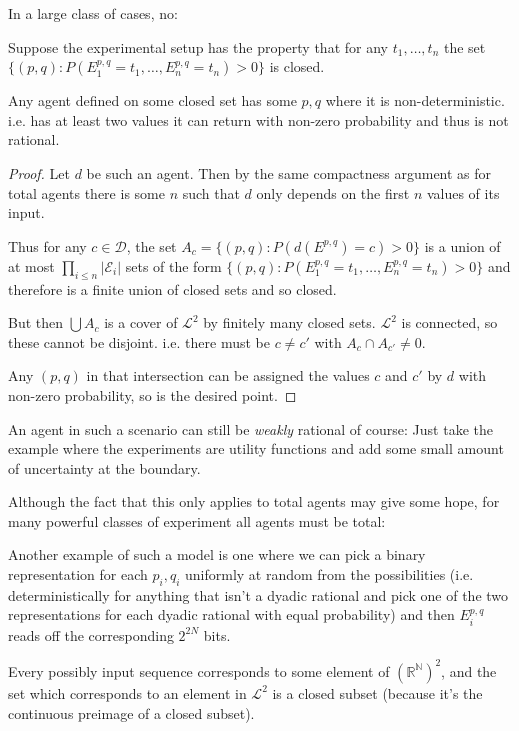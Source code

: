 In a large class of cases, no:

\begin{theorem}
Suppose the experimental setup has the property that for any $t_1, \ldots, t_n$
the set $\{(p, q): P(E^{p, q}_1 = t_1, \ldots, E^{p, q}_n = t_n) > 0\}$
is closed.

Any agent defined on some closed set has some $p, q$ where it is non-deterministic.
i.e. has at least two values it can return with non-zero probability and thus is
not rational.
\end{theorem}

\begin{proof}
Let $d$ be such an agent. Then by the same compactness argument as for total
agents there is some $n$ such that $d$ only depends on the first $n$ values of its input.

Thus for any $c \in \mathcal{D}$,
the set $A_c = \{(p, q): P(d(E^{p, q}) = c) > 0\}$
is a union of at most $\prod\limits_{i \leq n} |\mathcal{E}_i|$
sets of the form $\{(p, q): P(E^{p, q}_1 = t_1, \ldots, E^{p, q}_n = t_n) > 0\}$
and therefore is a finite union of closed sets and so closed.

But then $\bigcup A_c$
is a cover of $\mathcal{L}^2$
by finitely many closed sets. $\mathcal{L}^2$
is connected, so these cannot be disjoint. i.e. there must be $c \neq c'$ 
with $A_c \cap A_{c'} \neq 0$.

Any $(p, q)$
in that intersection can be assigned the values $c$ and $c'$
by $d$
with non-zero probability, so is the desired point.
\end{proof}

An agent in such a scenario can still be \textit{weakly} rational of course:
Just take the example where the experiments are utility functions and add some
small amount of uncertainty at the boundary.

Although the fact that this only applies to total agents may give some hope,
for many powerful classes of experiment all agents must be total:

Another example of such a model is one where we can pick a binary representation for
each $p_i, q_i$
uniformly at random from the possibilities (i.e. deterministically for anything
that isn't a dyadic rational and pick one of the two representations for each
dyadic rational with equal probability) and then $E^{p, q}_i$ reads off the
corresponding $2^{2N}$
bits.

Every possibly input sequence corresponds to some element of $(\mathbb{R^N})^2$,
and the set which corresponds to an element in $\mathcal{L}^2$
is a closed subset (because it's the continuous preimage of a closed subset).

